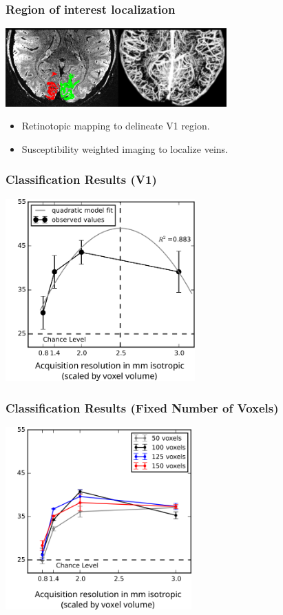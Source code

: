 \documentclass{beamer}
\begin{document}
  \begin{frame}
    \frametitle{Region of interest localization}
        \begin{center}
            \includegraphics[height=3cm]{pics/ROI}
        \end{center}
                \begin{itemize}
         \item Retinotopic mapping to delineate V1 region.
         \item Susceptibility weighted imaging to localize veins.
        \end{itemize} 
    \end{frame} 
    
  \begin{frame}
    \frametitle{Classification Results (V1)}
        \begin{center}
            \includegraphics[height=7cm]{pics/classification}
        \end{center}
    \end{frame}

  \begin{frame}
    \frametitle{Classification Results (Fixed Number of Voxels)}
        \begin{center}
            \includegraphics[height=7cm]{pics/fixed_voxels}
        \end{center}
    \end{frame}    
\end{document}
